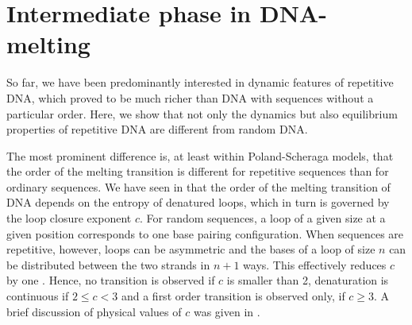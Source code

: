 \section{\label{sec:intermediate_phase}Intermediate phase in DNA-melting}
So far, we have been predominantly interested in dynamic features of repetitive
DNA, which proved to be much richer than DNA with sequences without a particular
order. Here, we show that not only the dynamics but also equilibrium properties of repetitive DNA 
are different from random DNA. 

The most prominent difference is, at least within Poland-Scheraga models,
 that the order of the melting transition is different for repetitive sequences than for ordinary sequences.
We have seen in  that the order of the melting transition of DNA
depends on the entropy of denatured loops, which in turn is governed by the loop closure exponent $c$.
For random sequences, a loop of a given size at a given position corresponds to one
base pairing configuration. When sequences are repetitive, however, loops can be asymmetric
and the bases of a loop of size $n$ can be distributed between the two strands in $n+1$ ways.
This effectively reduces $c$ by one \cite{Poland_70}. 
Hence, no transition is observed if $c$ is smaller than 2, denaturation is continuous 
if $2\!\leq\! c\!<\!3$ and a first order transition is observed only, if $c\!\geq \!3$.
A brief discussion of physical values of $c$ was given in .

